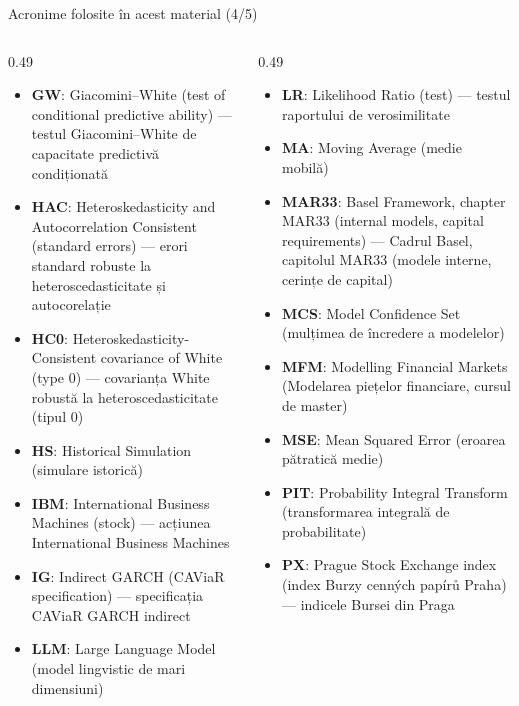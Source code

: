 \begin{frame}{Acronime folosite în acest material (4/5)}
\begin{columns}[T]
\begin{column}{0.49\textwidth}
\begin{itemize}\setlength{\itemsep}{0pt}
    \item \textbf{GW}: Giacomini–White (test of conditional predictive ability) — testul Giacomini–White de capacitate predictivă condiționată
    \item \textbf{HAC}: Heteroskedasticity and Autocorrelation Consistent (standard errors) — erori standard robuste la heteroscedasticitate și autocorelație
    \item \textbf{HC0}: Heteroskedasticity-Consistent covariance of White (type 0) — covarianța White robustă la heteroscedasticitate (tipul 0)
    \item \textbf{HS}: Historical Simulation (simulare istorică)
    \item \textbf{IBM}: International Business Machines (stock) — acțiunea International Business Machines
    \item \textbf{IG}: Indirect GARCH (CAViaR specification) — specificația CAViaR GARCH indirect
    \item \textbf{LLM}: Large Language Model (model lingvistic de mari dimensiuni)
\end{itemize}
\end{column}
\begin{column}{0.49\textwidth}
\begin{itemize}\setlength{\itemsep}{0pt}
    \item \textbf{LR}: Likelihood Ratio (test) — testul raportului de verosimilitate
    \item \textbf{MA}: Moving Average (medie mobilă)
    \item \textbf{MAR33}: Basel Framework, chapter MAR33 (internal models, capital requirements) — Cadrul Basel, capitolul MAR33 (modele interne, cerințe de capital)
    \item \textbf{MCS}: Model Confidence Set (mulțimea de încredere a modelelor)
    \item \textbf{MFM}: Modelling Financial Markets (Modelarea piețelor financiare, cursul de master)
    \item \textbf{MSE}: Mean Squared Error (eroarea pătratică medie)
    \item \textbf{PIT}: Probability Integral Transform (transformarea integrală de probabilitate)
    \item \textbf{PX}: Prague Stock Exchange index (index Burzy cenných papírů Praha) — indicele Bursei din Praga
\end{itemize}
\end{column}
\end{columns}
\end{frame}
